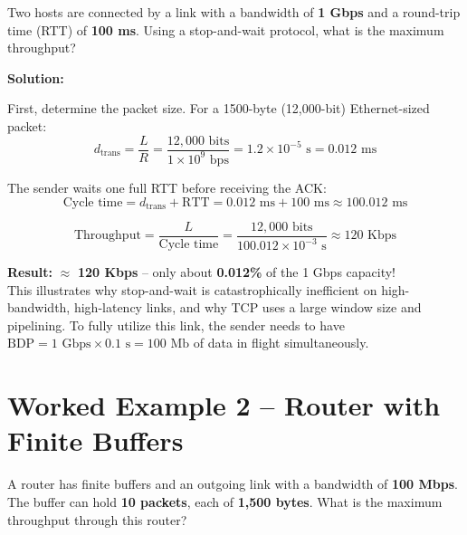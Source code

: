 \documentclass[11pt, letterpaper]{article}
\begin{document}
\begin{tcolorbox}[colback=part5bg, colframe=sectionteal,
  title={\bfseries Problem}, arc=3pt, boxrule=1pt]
Two hosts are connected by a link with a bandwidth of \textbf{1 Gbps} and a round-trip time (RTT) of \textbf{100 ms}. Using a stop-and-wait protocol, what is the maximum throughput?
\end{tcolorbox}

\textbf{Solution:}

First, determine the packet size. For a 1500-byte (12,000-bit) Ethernet-sized packet:
\[
  d_{\text{trans}} = \frac{L}{R} = \frac{12{,}000 \text{ bits}}{1 \times 10^9 \text{ bps}} = 1.2 \times 10^{-5} \text{ s} = 0.012 \text{ ms}
\]

The sender waits one full RTT before receiving the ACK:
\[
  \text{Cycle time} = d_{\text{trans}} + \text{RTT} = 0.012 \text{ ms} + 100 \text{ ms} \approx 100.012 \text{ ms}
\]

\[
  \text{Throughput} = \frac{L}{\text{Cycle time}} = \frac{12{,}000 \text{ bits}}{100.012 \times 10^{-3} \text{ s}} \approx 120 \text{ Kbps}
\]

\begin{tcolorbox}[colback=part5bg, colframe=sectionteal, arc=3pt, boxrule=1pt]
\textbf{Result:} $\approx$ \textbf{120 Kbps} -- only about \textbf{0.012\%} of the 1 Gbps capacity! \\
This illustrates why stop-and-wait is catastrophically inefficient on high-bandwidth, high-latency links, and why TCP uses a large window size and pipelining. To fully utilize this link, the sender needs to have $\text{BDP} = 1 \text{ Gbps} \times 0.1 \text{ s} = 100 \text{ Mb}$ of data in flight simultaneously.
\end{tcolorbox}

\section*{Worked Example 2 -- Router with Finite Buffers}

\begin{tcolorbox}[colback=part5bg, colframe=sectionteal,
  title={\bfseries Problem}, arc=3pt, boxrule=1pt]
A router has finite buffers and an outgoing link with a bandwidth of \textbf{100 Mbps}. The buffer can hold \textbf{10 packets}, each of \textbf{1,500 bytes}. What is the maximum throughput through this router?
\end{tcolorbox}
\end{document}
